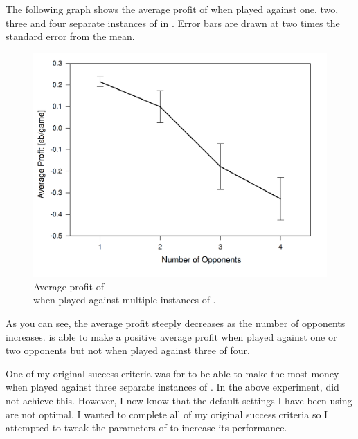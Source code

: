 The following graph shows the average profit of \mbt when played against one, two, three and four separate instances of \sbt in \pap. Error bars are drawn at two times the standard error from the mean.
\begin{figure}[H]
\centering
\includegraphics[width=144mm]{Graphs/SBvMB-num.png}
\caption{Average profit of \mbt \\ when played against multiple instances of \sbt.}
\end{figure}

As you can see, the average profit steeply decreases as the number of opponents increases. \mbt is able to make a positive average profit when played against one or two opponents but not when played against three of four. 




One of my original success criteria was for \mbt to be able to make the most money when played against three separate instances of \sbt. In the above experiment, \mbt did not achieve this. However, I now know that the default settings I have been using are not optimal. I wanted to complete all of my original success criteria so I attempted to tweak the parameters of \mbt to increase its performance. 

